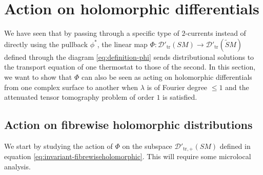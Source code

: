 \documentclass[reqno,12pt,letterpaper]{amsart}
\theoremstyle{definition}
\theoremstyle{remark}
\theoremstyle{definition}
\numberwithin{equation}{section}
\begin{document}
\section{Action on holomorphic differentials}\label{section:action-holomorphic-differentials}

We have seen that by passing through a specific type of $2$-currents instead of directly using the pullback $\phi^*$, the linear map $\Phi: \mathcal{D}'_{\text{tr}}(SM)\to \mathcal{D}'_{\text{tr}}(\widetilde{S}M)$ defined through the diagram \eqref{eq:definition-phi} sends distributional solutions to the transport equation of one thermostat to those of the second. In this section, we want to show that $\Phi$ can also be seen as acting on holomorphic differentials from one complex surface to another when $\lambda$ is of Fourier degree $\leq 1$ and the attenuated tensor tomography problem of order $1$ is satisfied.
\subsection{Action on fibrewise holomorphic distributions} We start by studying the action of $\Phi$ on the subspace $\mathcal{D}'_{\text{tr}, +}(SM)$ defined in equation \eqref{eq:invariant-fibrewiseholomorphic}. This will require some microlocal analysis. 
\end{document}
